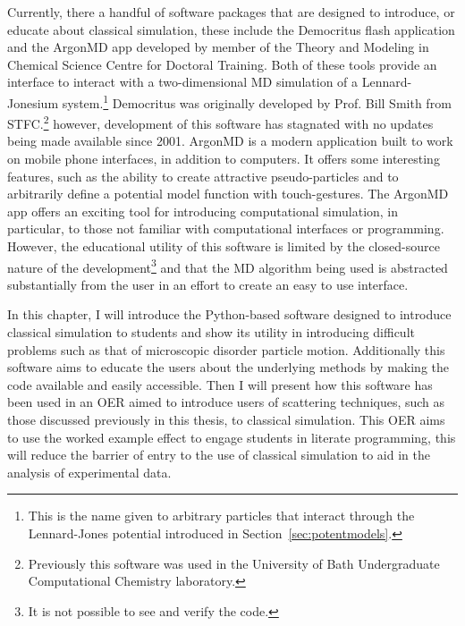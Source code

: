 Currently, there a handful of software packages that are designed to introduce, or educate about classical simulation, these include the Democritus flash application and the ArgonMD app developed by member of the Theory and Modeling in Chemical Science Centre for Doctoral Training.\autocite{noauthor_democritus_nodate,noauthor_argonmd_nodate}
Both of these tools provide an interface to interact with a two-dimensional MD simulation of a Lennard-Jonesium system.\footnote{This is the name given to arbitrary particles that interact through the Lennard-Jones potential introduced in Section~\ref{sec:potentmodels}.}
Democritus was originally developed by Prof. Bill Smith from STFC.\footnote{Previously this software was used in the University of Bath Undergraduate Computational Chemistry laboratory.} however, development of this software has stagnated with no updates being made available since 2001.
ArgonMD is a modern application built to work on mobile phone interfaces, in addition to computers.
It offers some interesting features, such as the ability to create attractive pseudo-particles and to arbitrarily define a potential model function with touch-gestures.
The ArgonMD app offers an exciting tool for introducing computational simulation, in particular, to those not familiar with computational interfaces or programming.
However, the educational utility of this software is limited by the closed-source nature of the development\footnote{It is not possible to see and verify the code.} and that the MD algorithm being used is abstracted substantially from the user in an effort to create an easy to use interface.

In this chapter, I will introduce the Python-based software designed to introduce classical simulation to students and show its utility in introducing difficult problems such as that of microscopic disorder particle motion.
Additionally this software aims to educate the users about the underlying methods by making the code available and easily accessible.
Then I will present how this software has been used in an OER aimed to introduce users of scattering techniques, such as those discussed previously in this thesis, to classical simulation.
This OER aims to use the worked example effect to engage students in literate programming, this will reduce the barrier of entry to the use of classical simulation to aid in the analysis of experimental data. 

